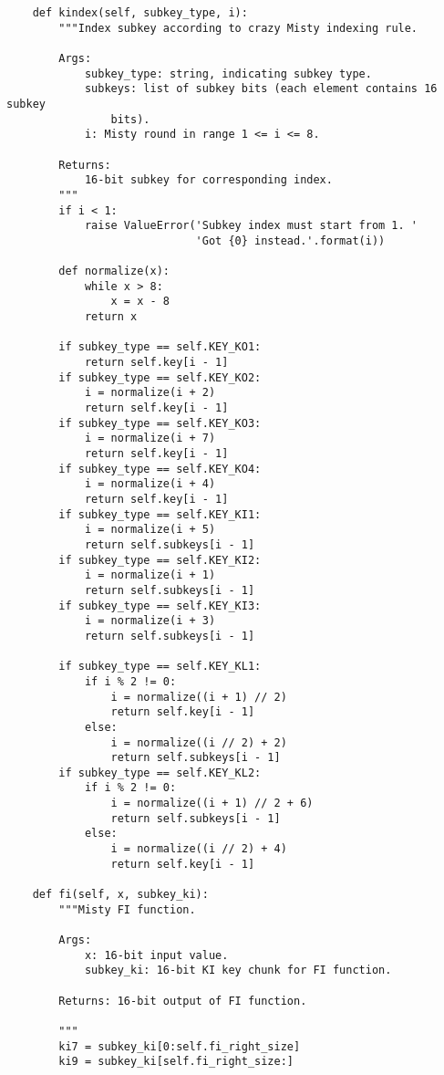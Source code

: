 \begin{lstlisting}
    def kindex(self, subkey_type, i):
        """Index subkey according to crazy Misty indexing rule.

        Args:
            subkey_type: string, indicating subkey type.
            subkeys: list of subkey bits (each element contains 16 subkey
                bits).
            i: Misty round in range 1 <= i <= 8.

        Returns:
            16-bit subkey for corresponding index.
        """
        if i < 1:
            raise ValueError('Subkey index must start from 1. '
                             'Got {0} instead.'.format(i))

        def normalize(x):
            while x > 8:
                x = x - 8
            return x

        if subkey_type == self.KEY_KO1:
            return self.key[i - 1]
        if subkey_type == self.KEY_KO2:
            i = normalize(i + 2)
            return self.key[i - 1]
        if subkey_type == self.KEY_KO3:
            i = normalize(i + 7)
            return self.key[i - 1]
        if subkey_type == self.KEY_KO4:
            i = normalize(i + 4)
            return self.key[i - 1]
        if subkey_type == self.KEY_KI1:
            i = normalize(i + 5)
            return self.subkeys[i - 1]
        if subkey_type == self.KEY_KI2:
            i = normalize(i + 1)
            return self.subkeys[i - 1]
        if subkey_type == self.KEY_KI3:
            i = normalize(i + 3)
            return self.subkeys[i - 1]

        if subkey_type == self.KEY_KL1:
            if i % 2 != 0:
                i = normalize((i + 1) // 2)
                return self.key[i - 1]
            else:
                i = normalize((i // 2) + 2)
                return self.subkeys[i - 1]
        if subkey_type == self.KEY_KL2:
            if i % 2 != 0:
                i = normalize((i + 1) // 2 + 6)
                return self.subkeys[i - 1]
            else:
                i = normalize((i // 2) + 4)
                return self.key[i - 1]

    def fi(self, x, subkey_ki):
        """Misty FI function.

        Args:
            x: 16-bit input value.
            subkey_ki: 16-bit KI key chunk for FI function.

        Returns: 16-bit output of FI function.

        """
        ki7 = subkey_ki[0:self.fi_right_size]
        ki9 = subkey_ki[self.fi_right_size:]


\end{lstlisting}

